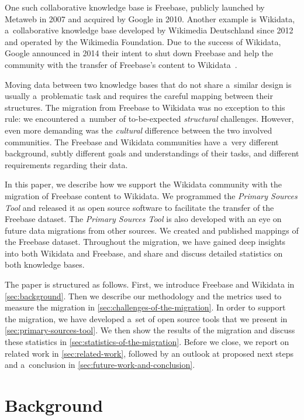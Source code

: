 \documentclass{acm_proc_article-sp}
\begin{document}
One such collaborative knowledge base is Freebase,
publicly launched by Metaweb in 2007 and acquired by Google in 2010.
Another example is Wikidata, a~collaborative knowledge base developed by
Wikimedia Deutschland since 2012 and operated by the Wikimedia Foundation.
Due to the success of Wikidata, Google announced in 2014 their intent to shut down Freebase and
help the community with the transfer of Freebase's content to Wikidata~\cite{freebase2014shutdown}.

Moving data between two knowledge bases that do not share a~similar design
is usually a~problematic task and requires the careful mapping between their structures.
The migration from Freebase to Wikidata was no exception to this rule:
we encountered a~number of to-be-expected \emph{structural} challenges.
However, even more demanding was the \emph{cultural} difference between the two involved communities.
The Freebase and Wikidata communities have a~very different background,
subtly different goals and understandings of their tasks,
and different requirements regarding their data.

In this paper, we describe how we support the Wikidata community with
the migration of Freebase content to Wikidata.
We programmed the \emph{Primary Sources Tool} and
released it as open source software to facilitate the transfer of the Freebase dataset.
The \emph{Primary Sources Tool} is also developed with an eye on
future data migrations from other sources.
We created and published mappings of the Freebase dataset.
Throughout the migration, we have gained deep insights into both Wikidata and Freebase,
and share and discuss detailed statistics on both knowledge bases. 

The paper is structured as follows.
First, we introduce Freebase and Wikidata in \autoref{sec:background}.
Then we describe our methodology and the metrics used to measure the migration
in \autoref{sec:challenges-of-the-migration}.
In order to support the migration, we have developed a~set of open source tools
that we present in \autoref{sec:primary-sources-tool}.
We then show the results of the migration
and discuss these statistics in \autoref{sec:statistics-of-the-migration}.
Before we close, we report on related work in \autoref{sec:related-work},
followed by an outlook at proposed next steps
and a~conclusion in \autoref{sec:future-work-and-conclusion}.

\section{Background}\label{sec:background}
\end{document}
